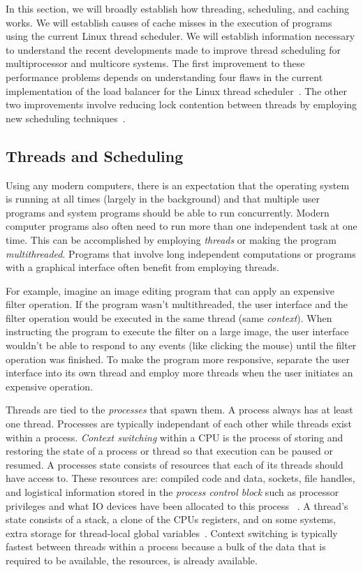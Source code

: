 \documentclass{sig-alternate}
\begin{document}
In this section, we will broadly establish how threading, scheduling, and caching works. We will establish causes of cache misses in the execution of programs using the current Linux thread scheduler. We will establish information necessary to understand the recent developments made to improve thread scheduling for multiprocessor and multicore systems. The first improvement to these performance problems depends on understanding four flaws in the current implementation of the load balancer for the Linux thread scheduler~\cite{Lozi:2016}. The other two improvements involve reducing lock contention between threads by employing new scheduling techniques~\cite{HeeseungEtal:2017,KumarEtal:2014}.

\subsection{Threads and Scheduling}
\label{sec:threads}
Using any modern computers, there is an expectation that the operating system is running at all times (largely in the background) and that multiple user programs and system programs should be able to run concurrently. Modern computer programs also often need to run more than one independent task at one time. This can be accomplished by employing \emph{threads} or  making the program \emph{multithreaded}. Programs that involve long independent computations or programs with a graphical interface often benefit from employing threads.

For example, imagine an image editing program that can apply an expensive filter operation. If the program wasn't multithreaded, the user interface and the filter operation would be executed in the same thread (same \emph{context}). When instructing the program to execute the filter on a large image, the user interface wouldn't be able to respond to any events (like clicking the mouse) until the filter operation was finished. To make the program more responsive, separate the user interface into its own thread and employ more threads when the user initiates an expensive operation.
	
Threads are tied to the \emph{processes} that spawn them. A process always has at least one thread. Processes are typically independant of each other while threads exist within a process. \emph{Context switching} within a CPU is the process of storing and restoring the state of a process or thread so that execution can be paused or resumed. A processes state consists of resources that each of its threads should have access to. These resources are: compiled code and data, sockets, file handles, and logistical information stored in the \emph{process control block} such as processor privileges and what IO devices have been allocated to this process ~\cite{WikiProcessControlBlock,WikiThreads}. A thread's state consists of a stack, a clone of the CPUs registers, and on some systems, extra storage for thread-local global variables~\cite{WikiThreads,WikiThreadLocalStorage}. Context switching is typically fastest between threads within a process because a bulk of the data that is required to be available, the resources, is already available.~\cite{WikiThreads} 
\end{document}
